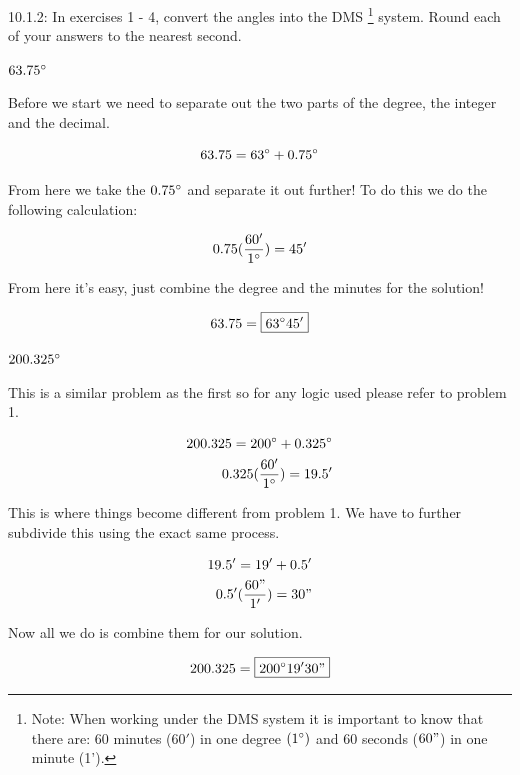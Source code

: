 \documentclass[10pt,letterpaper]{amspset}
\begin{document}

10.1.2: In exercises 1 - 4, convert the angles into the DMS \footnote{Note: When working under the DMS system it is important to know that there are: 60 minutes ($60'$) in one degree $(1\degree)$ and 60 seconds ($60"$) in one minute (1').} system. Round each of your answers to the nearest second.


\begin{problem}[1.]
    $63.75\degree$ 
\end{problem}

\begin{solution}[Solution]
Before we start we need to separate out the two parts of the degree, the integer and the decimal.

    \[63.75 = 63\degree + 0.75\degree\]

From here we take the $0.75\degree$ and separate it out further! To do this we do the following calculation:

    \[0.75 (\frac{60'}{1\degree}) = 45'\]

From here it's easy, just combine the degree and the minutes for the solution!

    \[63.75 = \boxed{63\degree 45'}\]

\end{solution}


\begin{problem} [2.]
    $200.325\degree$
\end{problem}

\begin{solution}[Solution]
This is a similar problem as the first so for any logic used please refer to problem 1. 

\begin{align}
    200.325 = 200\degree + 0.325\degree \\
    0.325 (\frac{60'}{1\degree}) = 19.5'
\end{align}

This is where things become different from problem 1. We have to further subdivide this using the exact same process. 

\begin{align}
    19.5' = 19' + 0.5' \\
    0.5' (\frac{60"}{1'}) = 30"
\end{align}

Now all we do is combine them for our solution.

    \[200.325 = \boxed{200\degree 19' 30"}\]

\end{solution}
\end{document}
